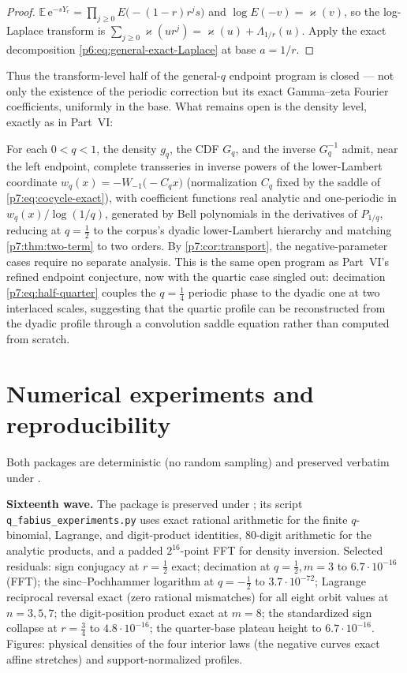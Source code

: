 \documentclass[11pt,oneside]{article}
\numberwithin{equation}{section}
\theoremstyle{definition}
\theoremstyle{remark}
\newcommand{\E}{\mathbb E}
\newcommand{\e}{\mathrm e}
\begin{document}
\begin{proof}
$\E\,\e^{-sY_r}=\prod_{j\ge0}E\bigl(-(1-r)r^js\bigr)$ and
$\log E(-v)=\varkappa(v)$, so the log-Laplace transform is
$\sum_{j\ge0}\varkappa(ur^{j})=\varkappa(u)+\Lambda_{1/r}(u)$.  Apply the
exact decomposition \eqref{p6:eq:general-exact-Laplace} at base $a=1/r$.
\end{proof}

Thus the transform-level half of the general-$q$ endpoint program is closed
--- not only the existence of the periodic correction but its exact
Gamma--zeta Fourier coefficients, uniformly in the base.  What remains open
is the density level, exactly as in Part~VI:

\begin{conjecture}
\label{p7:conj:all-orders}
For each $0<q<1$, the density $g_q$, the CDF $G_q$, and the inverse
$G_q^{-1}$ admit, near the left endpoint, complete transseries in inverse
powers of the lower-Lambert coordinate
$w_q(x)=-W_{-1}\bigl(-C_qx\bigr)$ (normalization $C_q$ fixed by the saddle
of \eqref{p7:eq:cocycle-exact}), with coefficient functions real analytic and
one-periodic in $w_q(x)/\log(1/q)$, generated by Bell polynomials in the
derivatives of $P_{1/q}$, reducing at $q=\tfrac12$ to the corpus's dyadic
lower-Lambert hierarchy and matching \cref{p7:thm:two-term} to two orders.
By \cref{p7:cor:transport}, the negative-parameter cases require no separate
analysis.  This is the same open program as Part~VI's refined endpoint
conjecture, now with the quartic case singled out: decimation
\eqref{p7:eq:half-quarter} couples the $q=\tfrac14$ periodic phase to the
dyadic one at two interlaced scales, suggesting that the quartic profile can
be reconstructed from the dyadic profile through a convolution saddle
equation rather than computed from scratch.
\end{conjecture}
\section{Numerical experiments and reproducibility}
\label{p7:sec:numerics}

Both packages are deterministic (no random sampling) and preserved verbatim
under .

\textbf{Sixteenth wave.}  The package is preserved under
; its script
\texttt{q\_fabius\_experiments.py} uses exact rational arithmetic for the
finite $q$-binomial, Lagrange, and digit-product identities, 80-digit
arithmetic for the analytic products, and a padded $2^{16}$-point FFT for
density inversion.
Selected residuals: sign conjugacy at $r=\tfrac12$ exact; decimation at
$q=\tfrac12,m=3$ to $6.7\cdot10^{-16}$ (FFT); the sinc--Pochhammer logarithm
at $q=-\tfrac12$ to $3.7\cdot10^{-72}$; Lagrange reciprocal reversal exact
(zero rational mismatches) for all eight orbit values at $n=3,5,7$; the
digit-position product exact at $m=8$; the standardized sign collapse at
$r=\tfrac34$ to $4.8\cdot10^{-16}$; the quarter-base plateau height to
$6.7\cdot10^{-16}$.  Figures: physical densities of the four interior laws
(the negative curves exact affine stretches) and support-normalized profiles.
\end{document}
